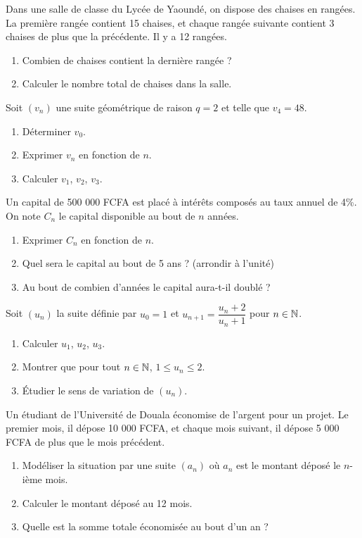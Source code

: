 \exo{}
Dans une salle de classe du Lycée de Yaoundé, on dispose des chaises en rangées. La première rangée contient 15 chaises, et chaque rangée suivante contient 3 chaises de plus que la précédente. Il y a 12 rangées.
\begin{enumerate}[label=\alph*)]
\item Combien de chaises contient la dernière rangée ?
\item Calculer le nombre total de chaises dans la salle.
\end{enumerate}


\exo{}
Soit $(v_n)$ une suite géométrique de raison $q = 2$ et telle que $v_4 = 48$.
\begin{enumerate}[label=\alph*)]
\item Déterminer $v_0$.
\item Exprimer $v_n$ en fonction de $n$.
\item Calculer $v_1$, $v_2$, $v_3$.
\end{enumerate}

\exo{}
Un capital de 500 000 FCFA est placé à intérêts composés au taux annuel de 4\%. On note $C_n$ le capital disponible au bout de $n$ années.
\begin{enumerate}[label=\alph*)]
\item Exprimer $C_n$ en fonction de $n$.
\item Quel sera le capital au bout de 5 ans ? (arrondir à l'unité)
\item Au bout de combien d'années le capital aura-t-il doublé ?
\end{enumerate}


\exo{}
Soit $(u_n)$ la suite définie par $u_0 = 1$ et $u_{n+1} = \dfrac{u_n + 2}{u_n + 1}$ pour $n\in\mathbb{N}$.
\begin{enumerate}[label=\alph*)]
\item Calculer $u_1$, $u_2$, $u_3$.
\item Montrer que pour tout $n\in\mathbb{N}$, $1 \leq u_n \leq 2$.
\item Étudier le sens de variation de $(u_n)$.
\end{enumerate}

\exo{}
Un étudiant de l'Université de Douala économise de l'argent pour un projet. Le premier mois, il dépose 10 000 FCFA, et chaque mois suivant, il dépose 5 000 FCFA de plus que le mois précédent.
\begin{enumerate}[label=\alph*)]
\item Modéliser la situation par une suite $(a_n)$ où $a_n$ est le montant déposé le $n$-ième mois.
\item Calculer le montant déposé au 12 mois.
\item Quelle est la somme totale économisée au bout d'un an ?
\end{enumerate}

